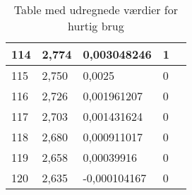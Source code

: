 \begin{table}[H]
\begin{tabular}{|l|l|l|l|l|}
114        & 2,774          & 0,003048246     & 1                   &           \\ \hline
115        & 2,750          & 0,0025          & 0                   &           \\ \hline
116        & 2,726          & 0,001961207     & 0                   &           \\ \hline
117        & 2,703          & 0,001431624     & 0                   &           \\ \hline
118        & 2,680          & 0,000911017     & 0                   &           \\ \hline
119        & 2,658          & 0,00039916      & 0                   &           \\ \hline
120        & 2,635          & -0,000104167    & 0                   &           \\ \hline
\end{tabular}
\caption{Table med udregnede værdier for hurtig brug}
\label{lookuptable}
\end{table}